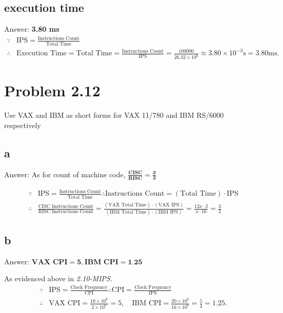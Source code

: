 \documentclass[11pt]{article}  %
\begin{document}
\subsection*{execution time}
    Answer: \textbf{3.80 ms}
    $$
    \begin{aligned}
        \because & \text{IPS} = \frac{\text{Instructions Count}}{\text{Total Time}} \\
        \therefore &\text{Execution Time} = \text{Total Time} = \frac{\text{Instructions Count}}{\text{IPS}} = 
            \frac{100000}{26.32 \times 10^6} \approx 3.80\times 10^{-3}\text{s} = 3.80\text{ms}.
    \end{aligned}
    $$

\section*{Problem 2.12}
    Use VAX and IBM as short forms for VAX 11/780 and IBM RS/6000 respectively
\subsection*{a}
    Answer: As for count of machine code, 
    $\displaystyle \mathbf{\frac{\textbf{CISC}}{\textbf{RISC}} = \frac{3}{2}}$

    $$
    \begin{aligned}
        \because  &\text{IPS} = \frac{\text{Instructions Count}}{\text{Total Time}} 
        \therefore \text{Instructions Count} = \left(\text{Total Time}\right) \cdot \text{IPS}\\
        \therefore &\frac{\text{CISC Instructions Count}}{\text{RISC Instructions Count}} = 
            \frac{\left(\text{VAX Total Time}\right) \cdot \left(\text{VAX IPS}\right)}
            {\left(\text{IBM Total Time}\right) \cdot \left(\text{IBM IPS}\right)}
            = \frac{12x\cdot 2}{x \cdot 16} = \frac{3}{2} 
    \end{aligned}
    $$

\subsection*{b}
    Answer: $\displaystyle \textbf{VAX CPI} = \textbf{5}, \textbf{IBM CPI} = \textbf{1.25}$

    As evidenced above in \textit{2.10-MIPS}.
    $$
    \begin{aligned}
        \because & \text{IPS} = \frac{\text{Clock Frequency}}{\text{CPI}}
        \therefore \text{CPI} = \frac{\text{Clock Frequency}}{\text{IPS}} \\ 
        \therefore &\text{VAX CPI} = \frac{10\times 10^6}{2\times 10^6} = 5, \quad
        \text{IBM CPI} = \frac{20\times 10^6}{16\times 10^6} = \frac{5}{4} = 1.25. 
    \end{aligned}
    $$
\end{document}
